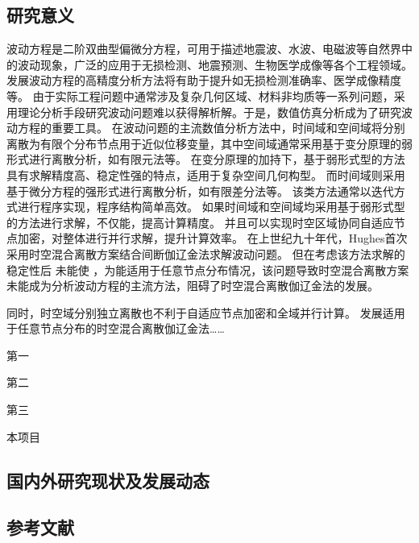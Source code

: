 
\subsection{研究意义}
波动方程是二阶双曲型偏微分方程，可用于描述地震波、水波、电磁波等自然界中的波动现象，广泛的应用于无损检测、地震预测、生物医学成像等各个工程领域。
发展波动方程的高精度分析方法将有助于提升如无损检测准确率、医学成像精度等。
由于实际工程问题中通常涉及复杂几何区域、材料非均质等一系列问题，采用理论分析手段研究波动问题难以获得解析解。于是，数值仿真分析成为了研究波动方程的重要工具。
在波动问题的主流数值分析方法中，时间域和空间域将分别离散为有限个分布节点用于近似位移变量，其中空间域通常采用基于变分原理的弱形式进行离散分析，如有限元法等。
在变分原理的加持下，基于弱形式型的方法具有求解精度高、稳定性强的特点，适用于复杂空间几何构型。
而时间域则采用基于微分方程的强形式进行离散分析，如有限差分法等。
该类方法通常以迭代方式进行程序实现，程序结构简单高效。
如果时间域和空间域均采用基于弱形式型的方法进行求解，不仅能，提高计算精度。
并且可以实现时空区域协同自适应节点加密，对整体进行并行求解，提升计算效率。
在上世纪九十年代，Hughes\cite{hughes1988}首次采用时空混合离散方案结合间断伽辽金法求解波动问题。
但在考虑该方法求解的稳定性后
未能使
，为能适用于任意节点分布情况，该问题导致时空混合离散方案未能成为分析波动方程的主流方法，阻碍了时空混合离散伽辽金法的发展。

同时，时空域分别独立离散也不利于自适应节点加密和全域并行计算。
发展适用于任意节点分布的时空混合离散伽辽金法……

第一

第二

第三

本项目

\subsection{国内外研究现状及发展动态}

\vspace{-5pt}

\begin{REF}
	\subsection*{参考文献}
	\vspace{-50pt}
	
\end{REF}

\newpage%
